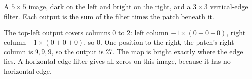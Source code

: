 \begin{workedexample}
A $5\times5$ image, dark on the left and bright on the right, and a $3\times3$ vertical-edge filter. Each output is the sum of the filter times the patch beneath it.

\medskip
\centering
{}
\par\raggedright
\medskip
The top-left output covers columns 0 to 2: left column $-1\times(0+0+0)$, right column $+1\times(0+0+0)$, so 0. One position to the right, the patch's right column is $9,9,9$, so the output is 27. The map is bright exactly where the edge lies. A horizontal-edge filter gives all zeros on this image, because it has no horizontal edge.
\end{workedexample}

